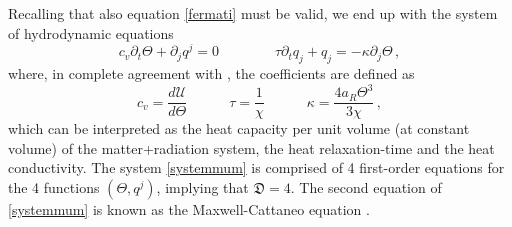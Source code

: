 \documentclass[a4paper, amsfonts, amssymb, amsmath, reprint, twocolumn, showkeys, nofootinbib]{revtex4-2}
\begin{document}
Recalling that also equation \eqref{fermati} must be valid, we end up with the system of hydrodynamic equations
\begin{equation}\label{systemmum}
 c_v \partial_t \Theta + \partial_j q^j=0 
 \qquad \qquad
 \tau \partial_t q_j + q_j = -\kappa \partial_j \Theta \, ,
\end{equation}
where, in complete agreement with \citet{Weinberg1971}, the coefficients are defined as
\begin{equation}\label{quattordici}
c_v = \dfrac{d \mathcal{U}}{d \Theta}  \quad \quad    \quad
\tau = \dfrac{1}{\chi} \quad \quad    \quad
\kappa = \dfrac{4 a_R \Theta^3}{3\chi} \,  ,
\end{equation}
which can be interpreted as the heat capacity per unit volume (at constant volume) of the  matter+radiation system, the heat relaxation-time and the heat conductivity. The system \eqref{systemmum} is comprised of 4 first-order equations for the  4 functions $(\Theta,q^j)$, implying that $\mathfrak{D}=4$. The second equation of \eqref{systemmum} is known as the Maxwell-Cattaneo equation \cite{Jou_Extended}.
%
%
%
\end{document}

